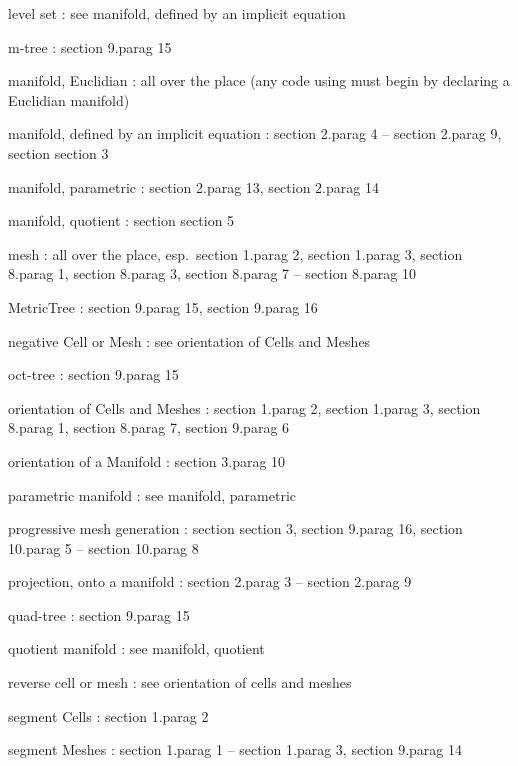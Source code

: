 level set : see manifold, defined by an implicit equation

m-tree : \numb section 9.\numb parag 15

manifold, Euclidian : all over the place\hfil\break
\hglue 15mm (any code using {\maniFEM} must begin by declaring a Euclidian manifold)

manifold, defined by an implicit equation : \numb section 2.\numb parag 4 --
\numb section 2.\numb parag 9, section \numb section 3

manifold, parametric : \numb section 2.\numb parag 13, \numb section 2.\numb parag 14

manifold, quotient : section \numb section 5

mesh : all over the place, esp.\ \numb section 1.\numb parag 2, \numb section 1.\numb parag 3,
\numb section 8.\numb parag 1, \numb section 8.\numb parag 3, \numb section 8.\numb parag 7
-- \numb section 8.\numb parag 10

{\codett MetricTree} : \numb section 9.\numb parag 15, \numb section 9.\numb parag 16

negative {\codett Cell} or {\codett Mesh} : see orientation of {\codett Cell}s and
{\codett Mesh}es

oct-tree : \numb section 9.\numb parag 15

orientation of {\codett Cell}s and {\codett Mesh}es : \numb section 1.\numb parag 2,
\numb section 1.\numb parag 3, \numb section 8.\numb parag 1, \numb section 8.\numb parag 7,
\numb section 9.\numb parag 6

orientation of a {\codett Manifold} : \numb section 3.\numb parag 10

parametric manifold : see manifold, parametric

progressive mesh generation : section \numb section 3, \numb section 9.\numb parag 16,
\numb section 10.\numb parag 5 -- \numb section 10.\numb parag 8

projection, onto a manifold : \numb section 2.\numb parag 3 -- \numb section 2.\numb parag 9

quad-tree : \numb section 9.\numb parag 15

quotient manifold : see manifold, quotient

reverse cell or mesh : see orientation of cells and meshes

segment {\codett Cell}s : \numb section 1.\numb parag 2

segment {\codett Mesh}es : \numb section 1.\numb parag 1 -- \numb section 1.\numb parag 3,
\numb section 9.\numb parag 14

